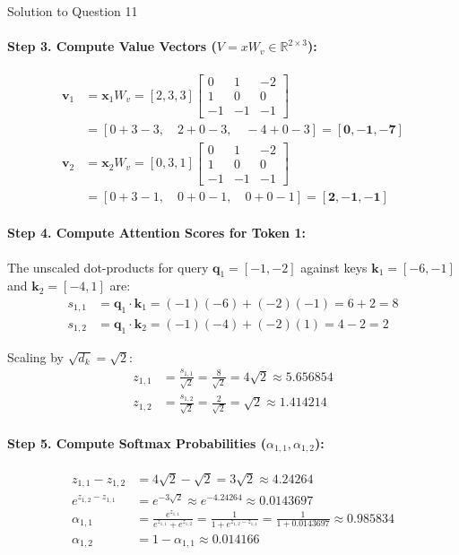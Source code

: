 \documentclass[11pt,a4paper]{article}
\begin{document}
\begin{solutionbox}{Solution to Question 11}
\paragraph{Step 3. Compute Value Vectors ($V = x W_v \in \mathbb{R}^{2 \times 3}$):}
\begin{align*}
\mathbf{v}_1 &= \mathbf{x}_1 W_v = [2, 3, 3] \begin{bmatrix} 0 & 1 & -2 \\ 1 & 0 & 0 \\ -1 & -1 & -1 \end{bmatrix} \\
&= [0 + 3 - 3, \quad 2 + 0 - 3, \quad -4 + 0 - 3] = \mathbf{[0, -1, -7]} \\[0.2cm]
\mathbf{v}_2 &= \mathbf{x}_2 W_v = [0, 3, 1] \begin{bmatrix} 0 & 1 & -2 \\ 1 & 0 & 0 \\ -1 & -1 & -1 \end{bmatrix} \\
&= [0 + 3 - 1, \quad 0 + 0 - 1, \quad 0 + 0 - 1] = \mathbf{[2, -1, -1]}
\end{align*}

\paragraph{Step 4. Compute Attention Scores for Token 1:}
The unscaled dot-products for query $\mathbf{q}_1 = [-1, -2]$ against keys $\mathbf{k}_1 = [-6, -1]$ and $\mathbf{k}_2 = [-4, 1]$ are:
\begin{align*}
s_{1,1} &= \mathbf{q}_1 \cdot \mathbf{k}_1 = (-1)(-6) + (-2)(-1) = 6 + 2 = 8 \\
s_{1,2} &= \mathbf{q}_1 \cdot \mathbf{k}_2 = (-1)(-4) + (-2)(1) = 4 - 2 = 2
\end{align*}

Scaling by $\sqrt{d_k} = \sqrt{2}$:
\begin{align*}
z_{1,1} &= \frac{s_{1,1}}{\sqrt{2}} = \frac{8}{\sqrt{2}} = 4\sqrt{2} \approx 5.656854 \\
z_{1,2} &= \frac{s_{1,2}}{\sqrt{2}} = \frac{2}{\sqrt{2}} = \sqrt{2} \approx 1.414214
\end{align*}

\paragraph{Step 5. Compute Softmax Probabilities ($\alpha_{1,1}, \alpha_{1,2}$):}
\begin{align*}
z_{1,1} - z_{1,2} &= 4\sqrt{2} - \sqrt{2} = 3\sqrt{2} \approx 4.24264 \\
e^{z_{1,2} - z_{1,1}} &= e^{-3\sqrt{2}} \approx e^{-4.24264} \approx 0.0143697 \\[0.2cm]
\alpha_{1,1} &= \frac{e^{z_{1,1}}}{e^{z_{1,1}} + e^{z_{1,2}}} = \frac{1}{1 + e^{z_{1,2} - z_{1,1}}} = \frac{1}{1 + 0.0143697} \approx \mathbf{0.985834} \\[0.2cm]
\alpha_{1,2} &= 1 - \alpha_{1,1} \approx \mathbf{0.014166}
\end{align*}


\end{solutionbox}
\end{document}
